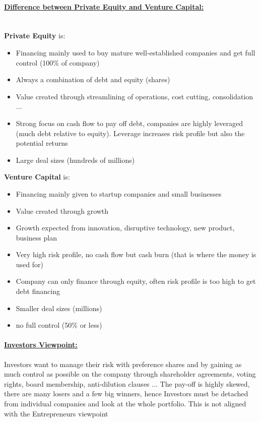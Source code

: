 \documentclass[8pt]{extreport}
\begin{document}
{\paragraph{\underline{Difference between Private Equity and Venture Capital:}\\ \\}
\textbf{Private Equity} is:
\begin{itemize}
\item Financing mainly used to buy mature well-established companies and get full control (100$\%$ of company)
\item Always a combination of debt and equity (shares)
\item Value created through streamlining of operations, cost cutting, consolidation ...
\item Strong focus on cash flow to pay off debt, companies are highly leveraged (much debt relative to equity). Leverage increases risk profile but also the potential returns
\item Large deal sizes (hundreds of millions)
\end{itemize}
\textbf{Venture Capital} is:
\begin{itemize}
\item Financing mainly given to startup companies and small businesses
\item Value created through growth
\item Growth expected from innovation, disruptive technology, new product, business plan
\item Very high risk profile, no cash flow but cash burn (that is where the money is used for)
\item Company can only finance through equity, often risk profile is too high to get debt financing
\item Smaller deal sizes (millions)
\item no full control (50$\%$ or less)

\end{itemize}
\paragraph{\underline{Investors Viewpoint:}} Investors want to manage their risk with preference shares and by gaining as much control as possible on the company through shareholder agreements, voting rights, board membership, anti-dilution clauses ... The pay-off is highly skewed, there are many losers and a few big winners, hence Investors must be detached from individual companies and look at the whole portfolio. This is not aligned with the Entrepreneurs viewpoint
}
\end{document}
